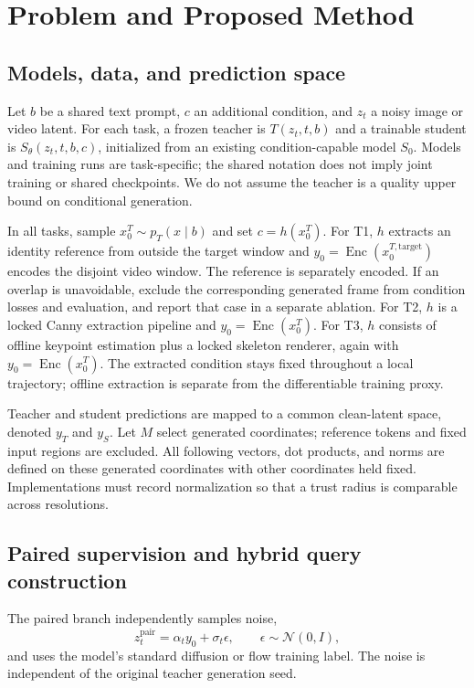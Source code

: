 \documentclass{article}
\begin{document}
\section{Problem and Proposed Method}
\subsection{Models, data, and prediction space}
Let $b$ be a shared text prompt, $c$ an additional condition, and $z_t$ a noisy image or video latent. For each task, a frozen teacher is $T(z_t,t,b)$ and a trainable student is $S_\theta(z_t,t,b,c)$, initialized from an existing condition-capable model $S_0$. Models and training runs are task-specific; the shared notation does not imply joint training or shared checkpoints. We do not assume the teacher is a quality upper bound on conditional generation.

In all tasks, sample $x_0^T\sim p_T(x\mid b)$ and set $c=h(x_0^T)$. For T1, $h$ extracts an identity reference from outside the target window and $y_0=\operatorname{Enc}(x_0^{T,\mathrm{target}})$ encodes the disjoint video window. The reference is separately encoded. If an overlap is unavoidable, exclude the corresponding generated frame from condition losses and evaluation, and report that case in a separate ablation. For T2, $h$ is a locked Canny extraction pipeline and $y_0=\operatorname{Enc}(x_0^T)$. For T3, $h$ consists of offline keypoint estimation plus a locked skeleton renderer, again with $y_0=\operatorname{Enc}(x_0^T)$. The extracted condition stays fixed throughout a local trajectory; offline extraction is separate from the differentiable training proxy.

Teacher and student predictions are mapped to a common clean-latent space, denoted $y_T$ and $y_S$. Let $M$ select generated coordinates; reference tokens and fixed input regions are excluded. All following vectors, dot products, and norms are defined on these generated coordinates with other coordinates held fixed. Implementations must record normalization so that a trust radius is comparable across resolutions.

\subsection{Paired supervision and hybrid query construction}
The paired branch independently samples noise,
\begin{equation}
 z_t^{\mathrm{pair}}=\alpha_t y_0+\sigma_t\epsilon,
 \qquad \epsilon\sim\mathcal N(0,I),
\end{equation}
and uses the model's standard diffusion or flow training label. The noise is independent of the original teacher generation seed.
\end{document}
